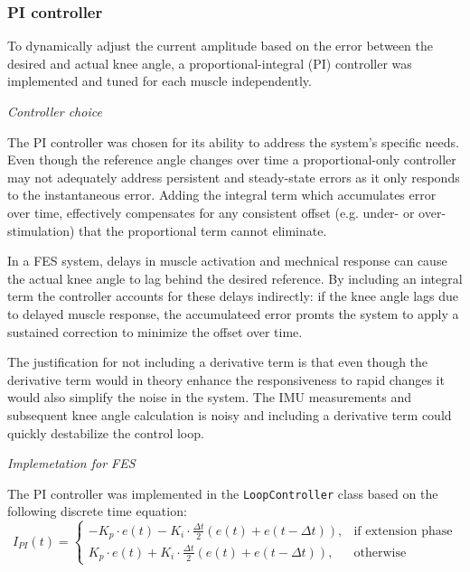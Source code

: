\subsubsection{PI controller}
To dynamically adjust the current amplitude based on the error between the desired and actual knee angle, a proportional-integral (PI) controller was implemented and tuned for each muscle independently. 
\newline


\textit{Controller choice}

The PI controller was chosen for its ability to address the system's specific needs.  Even though the reference angle changes over time a proportional-only controller may not adequately address persistent and steady-state errors as it only responds to the instantaneous error. Adding the integral term which accumulates error over time, effectively compensates for any consistent offset (e.g. under- or over-stimulation) that the proportional term cannot eliminate. 


In a FES system, delays in muscle activation and mechnical response can cause the actual knee angle to lag behind the desired reference. By including an integral term the controller accounts for these delays indirectly: if the knee angle lags due to delayed muscle response, the accumulateed error promts the system to apply a sustained correction to minimize the offset over time.

The justification for not including a derivative term is that even though the derivative term would in theory enhance the responsiveness to rapid changes it would also simplify the noise in the system. The IMU measurements and subsequent knee angle calculation is noisy and including a derivative term could quickly destabilize the control loop.
\newline 

\textit{Implemetation for FES}

The PI controller was implemented in the \texttt{LoopController} class based on the following discrete time equation:
\begin{equation}
I_{PI}(t) = 
\begin{cases} 
-K_p \cdot e(t) - K_i \cdot \frac{\Delta t}{2} \left(e(t) + e(t-\Delta t)\right), & \text{if extension phase} \\
K_p \cdot e(t) + K_i \cdot \frac{\Delta t}{2} \left(e(t) + e(t-\Delta t)\right), & \text{otherwise}
\end{cases}
\end{equation}

